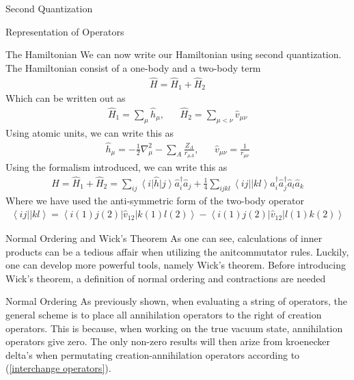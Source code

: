 \documentclass[twoside,english]{uiofysmaster}
\begin{document}
\begin{chapter}{Second Quantization}
\begin{section}{Representation of Operators}
		\begin{subsection}{The Hamiltonian}
			We can now write our Hamiltonian using second quantization. The Hamiltonian consist of a one-body and a two-body term
			\begin{align}
				\hat H = \hat H_1 + \hat H_2
			\end{align}
			Which can be written out as
			\begin{align}
				\hat H_1 = \sum_\mu \hat h_\mu, \:\;\;\;\;\; \hat H_2 = \sum_{\mu < \nu} \hat v_{\mu \nu}
			\end{align}
			Using atomic units, we can write this as
			\begin{align}
				\hat h_\mu = -\frac{1}{2}\nabla_\mu^2 - \sum_A \frac{Z_A}{r_{\mu A}}, \:\;\;\;\;\; \hat v_{\mu \nu} = \frac{1}{r_{\mu \nu}}
			\end{align}
			Using the formalism introduced, we can write this as
			\begin{align}
				\hat H = \hat H_1 + \hat H_2 = \sum_{ij} \left<i \right| \hat h \left| j \right> \hat a_i^\dagger \hat a_j 
						+ \frac{1}{4} \sum_{ijkl} \left<ij|| kl \right> \hat a_i^\dagger \hat a_j^\dagger \hat a_l \hat a_k
			\end{align}
			Where we have used the anti-symmetric form of the two-body operator
			\begin{align}
				\left<ij|| kl \right> = \left< i(1) j(2) \right| \hat v_{12} \left| k(1) l(2) \right> - \left< i(1) j(2) \right| \hat v_{12} \left| l(1) k(2) \right>
			\end{align}
		\end{subsection}

	\end{section}

	\begin{section}{Normal Ordering and Wick's Theorem}
		As one can see, calculations of inner products can be a tedious affair when utilizing the anitcommutator rules. Luckily, one can develop more powerful tools, namely Wick's theorem. Before introducing Wick's theorem, a definition of normal ordering and contractions are needed
		\begin{subsection}{Normal Ordering}
			As previously shown, when evaluating a string of operators, the general scheme is to place all annihilation operators to the right of creation operators. This is because, when working on the true vacuum state, annihilation operators give zero. The only non-zero results will then arize from kroenecker delta's when permutating creation-annihilation operators according to (\ref{interchange operators}). 


\end{subsection}
\end{section}
\end{chapter}
\end{document}
